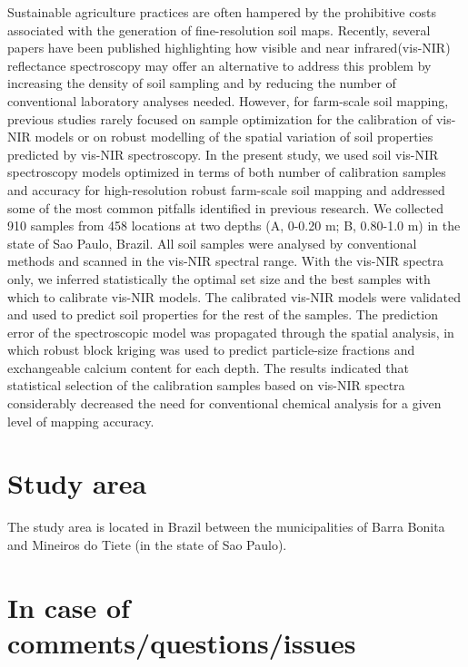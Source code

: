 \documentclass[]{book}
\begin{document}
Sustainable agriculture practices are often hampered by the prohibitive costs associated with the generation of fine-resolution soil maps. Recently, several papers have been published highlighting how visible and near infrared(vis-NIR) reflectance spectroscopy may offer an alternative to address this problem by increasing the density of soil sampling and by reducing the number of conventional laboratory analyses needed. However, for farm-scale soil mapping, previous studies rarely focused on sample optimization for the calibration of vis-NIR models or on robust modelling of the spatial variation of soil properties predicted by vis-NIR spectroscopy. In the present study, we used soil vis-NIR spectroscopy models optimized in terms of both number of calibration samples and accuracy for high-resolution robust farm-scale soil mapping and addressed some of the most common pitfalls identified in previous research. We collected 910 samples from 458 locations at two depths (A, 0-0.20 m; B, 0.80-1.0 m) in the state of Sao Paulo, Brazil. All soil samples were analysed by conventional methods and scanned in the vis-NIR spectral range. With the vis-NIR spectra only, we inferred statistically the optimal set size and the best samples with which to calibrate vis-NIR models. The calibrated vis-NIR models were validated and used to predict soil properties for the rest of the samples. The prediction error of the spectroscopic model was propagated through the spatial analysis, in which robust block kriging was used to predict particle-size fractions and exchangeable calcium content for each depth. The results indicated that statistical selection of the calibration samples based on vis-NIR spectra considerably decreased the need for conventional chemical analysis for a given level of mapping accuracy.

\hypertarget{study-area}{%
\section{Study area}\label{study-area}}

The study area is located in Brazil between the municipalities of Barra Bonita and Mineiros do Tiete (in the state of Sao Paulo).

\hypertarget{htmlwidget-59da9075d2f70dc772c2}{}

\hypertarget{in-case-of-commentsquestionsissues}{%
\section{In case of comments/questions/issues}\label{in-case-of-commentsquestionsissues}}
\end{document}
